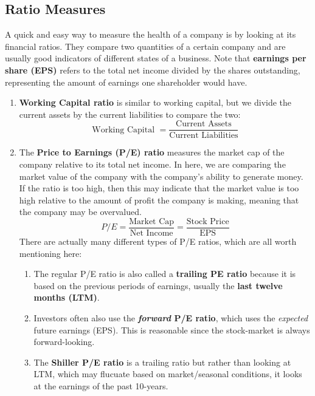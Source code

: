 \documentclass{article}
\begin{document}
  \subsection{Ratio Measures}

    A quick and easy way to measure the health of a company is by looking at its financial ratios. They compare two quantities of a certain company and are usually good indicators of different states of a business. Note that \textbf{earnings per share (EPS)} refers to the total net income divided by the shares outstanding, representing the amount of earnings one shareholder would have.

    \begin{enumerate}
      \item \textbf{Working Capital ratio} is similar to working capital, but we divide the current assets by the current liabilities to compare the two:
      \begin{equation}
        \text{Working Capital } = \frac{\text{Current Assets}}{\text{Current Liabilities}}
      \end{equation}

      \item The \textbf{Price to Earnings (P/E) ratio} measures the market cap of the company relative to its total net income. In here, we are comparing the market value of the company with the company's ability to generate money. If the ratio is too high, then this may indicate that the market value is too high relative to the amount of profit the company is making, meaning that the company may be overvalued.
      \begin{equation}
        P/E = \frac{\text{Market Cap}}{\text{Net Income}} = \frac{\text{Stock Price}}{\text{EPS}}
      \end{equation}
      There are actually many different types of P/E ratios, which are all worth mentioning here:
      \begin{enumerate}
        \item The regular P/E ratio is also called a \textbf{trailing PE ratio} because it is based on the previous periods of earnings, usually the \textbf{last twelve months (LTM)}.
        \item Investors often also use the \textbf{\textit{forward} P/E ratio}, which uses the \textit{expected} future earnings (EPS). This is reasonable since the stock-market is always forward-looking.
        \item The \textbf{Shiller P/E ratio} is a trailing ratio but rather than looking at LTM, which may flucuate based on market/seasonal conditions, it looks at the earnings of the past 10-years.
      \end{enumerate}


\end{enumerate}
\end{document}
